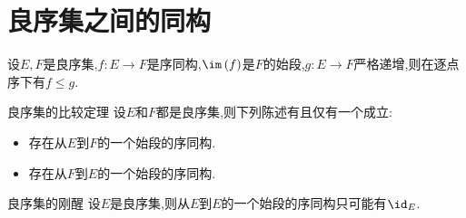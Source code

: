 \section{良序集之间的同构}

\begin{lemma}{}{}
	设$E,F$是良序集,$f:E\to F$是序同构,$\im\left(f\right)$是$F$的始段,$g:E\to F$严格递增,则在逐点序下有$f\leq g$.
\end{lemma}

\begin{theorem}{良序集的比较定理}{}
	设$E$和$F$都是良序集,则下列陈述有且仅有一个成立:
	\begin{itemize}
		\item 存在从$E$到$F$的一个始段的序同构.
		\item 存在从$F$到$E$的一个始段的序同构.
	\end{itemize}
\end{theorem}

\begin{corollary}{良序集的刚醒}{}
	设$E$是良序集,则从$E$到$E$的一个始段的序同构只可能有$\id_{E}$.
\end{corollary}

































